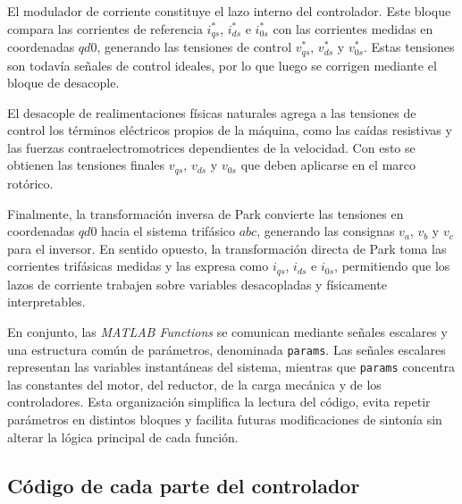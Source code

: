 \documentclass[12pt, a4paper,journal, onecolumn, compsoc]{IEEEtran}
\begin{document}
El modulador de corriente constituye el lazo interno del controlador. Este bloque compara las corrientes de referencia $i_{qs}^{*}$, $i_{ds}^{*}$ e $i_{0s}^{*}$ con las corrientes medidas en coordenadas $qd0$, generando las tensiones de control $v_{qs}^{*}$, $v_{ds}^{*}$ y $v_{0s}^{*}$. Estas tensiones son todavía señales de control ideales, por lo que luego se corrigen mediante el bloque de desacople.

El desacople de realimentaciones físicas naturales agrega a las tensiones de control los términos eléctricos propios de la máquina, como las caídas resistivas y las fuerzas contraelectromotrices dependientes de la velocidad. Con esto se obtienen las tensiones finales $v_{qs}$, $v_{ds}$ y $v_{0s}$ que deben aplicarse en el marco rotórico.

Finalmente, la transformación inversa de Park convierte las tensiones en coordenadas $qd0$ hacia el sistema trifásico $abc$, generando las consignas $v_a$, $v_b$ y $v_c$ para el inversor. En sentido opuesto, la transformación directa de Park toma las corrientes trifásicas medidas y las expresa como $i_{qs}$, $i_{ds}$ e $i_{0s}$, permitiendo que los lazos de corriente trabajen sobre variables desacopladas y físicamente interpretables.

En conjunto, las \textit{MATLAB Functions} se comunican mediante señales escalares y una estructura común de parámetros, denominada \texttt{params}. Las señales escalares representan las variables instantáneas del sistema, mientras que \texttt{params} concentra las constantes del motor, del reductor, de la carga mecánica y de los controladores. Esta organización simplifica la lectura del código, evita repetir parámetros en distintos bloques y facilita futuras modificaciones de sintonía sin alterar la lógica principal de cada función.
\subsection{Código de cada parte del controlador}
\end{document}
